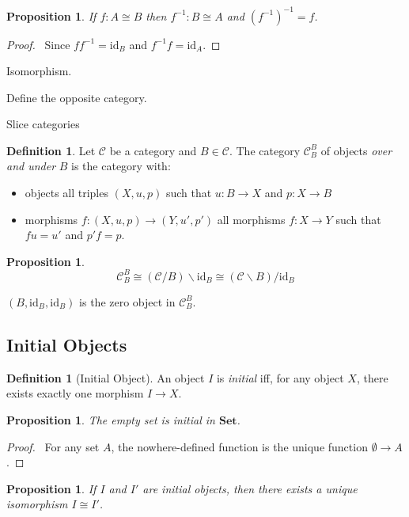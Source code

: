 \documentclass{book}
\let\qed\relax
\newtheorem{prop}[ax]{Proposition}
\theoremstyle{definition}
\newtheorem{df}[ax]{Definition}
\newcommand{\id}[1]{\ensuremath{\mathrm{id}_{#1}}}
\newcommand{\inv}[1]{\ensuremath{{#1}^{-1}}}
\newcommand{\Set}{\ensuremath{\mathbf{Set}}}
\begin{document}
\begin{prop}
If $f : A \cong B$ then $\inv{f} : B \cong A$ and $\inv{(\inv{f})} = f$.
\end{prop}

\begin{proof}
\pf\ Since $f\inv{f} = \id{B}$ and $\inv{f}f = \id{A}$. \qed
\end{proof}

Isomorphism.

Define the opposite category.

Slice categories

\begin{df}
Let $\mathcal{C}$ be a category and $B \in \mathcal{C}$. The category $\mathcal{C}_B^B$ of objects \emph{over and under} $B$ is the category with:
\begin{itemize}
\item objects all triples $(X,u,p)$ such that $u : B \rightarrow X$ and $p : X \rightarrow B$
\item morphisms $f : (X,u,p) \rightarrow (Y,u',p')$ all morphisms $f : X \rightarrow Y$ such that $fu=u'$ and $p'f=p$.
\end{itemize}
\end{df}

\begin{prop}
\[ \mathcal{C}_B^B \cong (\mathcal{C} / B) \backslash \id{B} \cong (\mathcal{C} \backslash B) / \id{B} \]
\end{prop}

$(B, \id{B}, \id{B})$ is the zero object in $\mathcal{C}_B^B$.

\subsection{Initial Objects}

\begin{df}[Initial Object]
An object $I$ is \emph{initial} iff, for any object $X$, there exists exactly one morphism $I \rightarrow X$.
\end{df}

\begin{prop}
The empty set is initial in $\Set$.
\end{prop}

\begin{proof}
\pf\ For any set $A$, the nowhere-defined function is the unique function $\emptyset \rightarrow A$. \qed
\end{proof}

\begin{prop}
\label{prop:initial_unique}
If $I$ and $I'$ are initial objects, then there exists a unique isomorphism $I \cong I'$.
\end{prop}
\end{document}
